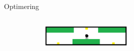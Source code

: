 \begin{frame}{Optimering}{}
\begin{columns}[T]
\begin{column}{.65\textwidth}
\begin{figure}[H]



\vspace{0.45cm}
  \begin{subfigure}{0.98\textwidth}
        \centering
        \includegraphics[width=0.5\textwidth]{Billeder/AngleSensor}
        \end{subfigure}     


\end{figure}

\end{column}
\end{columns}

\end{frame}




